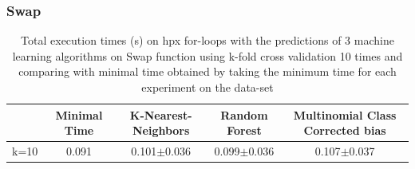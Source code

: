 \subsubsection{Swap}

\begin{table}[H]
	\centering
	\caption{Total execution times (s) on hpx for-loops with the predictions of 3 machine learning algorithms on Swap function using k-fold cross validation 10 times and comparing with minimal time obtained by taking the minimum time for each experiment on the data-set}
	\label{my-label}
	\begin{tabular}{|c|c|c|c|c|}
		\hline
		& Minimal Time&K-Nearest-Neighbors & Random Forest &Multinomial Class Corrected bias\\ \hline
		k=10  &0.091&
		0.101$\pm$0.036       & 0.099$\pm$0.036&0.107$\pm$0.037 \\ \hline
	\end{tabular}
\end{table}

